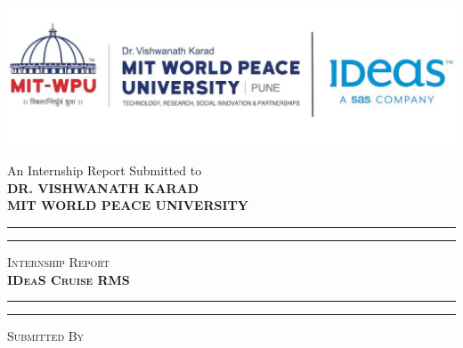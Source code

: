 \documentclass[openany, 11pt]{report} %
\begin{document}
\begin{titlepage}
    \centering


    \vspace{1\baselineskip} %
    \includegraphics[width=1\textwidth]{logo.jpg} %


    \LARGE{
        An Internship Report Submitted to\\
        \textbf{DR. VISHWANATH KARAD\\
        MIT WORLD PEACE UNIVERSITY}\\
    }

    \vfill %


    \rule{\textwidth}{1.6pt}\vspace*{-\baselineskip}\vspace*{2pt}
    \rule{\textwidth}{0.6pt}
    \vspace{0.3\baselineskip} %


    \huge{\textsc{
            Internship Report\\
            \textbf{IDeaS Cruise RMS}
        }} \\


    \vspace{0.3\baselineskip} %
    \rule{\textwidth}{0.6pt}\vspace*{-\baselineskip}\vspace*{2.8pt}
    \rule{\textwidth}{1.6pt}

    \vspace{1\baselineskip} %


    \LARGE\textsc{
        Submitted By\\
    } %


\end{titlepage}
\end{document}
